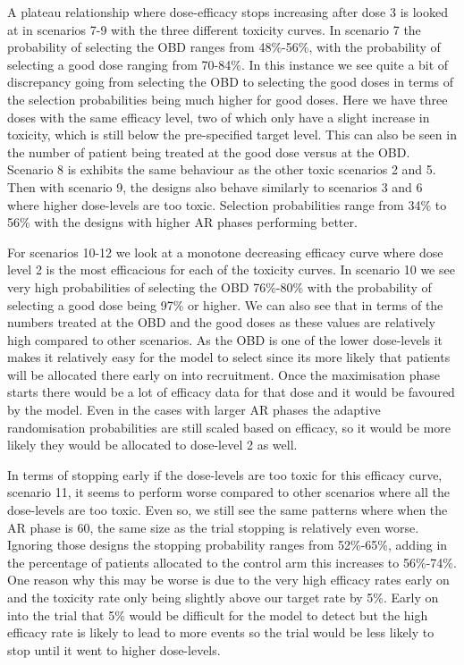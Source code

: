 A plateau relationship where dose-efficacy stops increasing after dose 3 is looked at in scenarios 7-9 with the three different toxicity curves. In scenario 7 the probability of selecting the OBD ranges from 48\%-56\%, with the probability of selecting a good dose ranging from 70-84\%. In this instance we see quite a bit of discrepancy going from selecting the OBD to selecting the good doses in terms of the selection probabilities being much higher for good doses. Here we have three doses with the same efficacy level, two of which only have a slight increase in toxicity, which is still below the pre-specified target level. This can also be seen in the number of patient being treated at the good dose versus at the OBD. Scenario 8 is exhibits the same behaviour as the other toxic scenarios 2 and 5. Then with scenario 9, the designs also behave similarly to scenarios 3 and 6 where higher dose-levels are too toxic. Selection probabilities range from 34\% to 56\% with the designs with higher AR phases performing better. 

For scenarios 10-12 we look at a monotone decreasing efficacy curve where dose level 2 is the most efficacious for each of the toxicity curves. In scenario 10 we see very high probabilities of selecting the OBD 76\%-80\% with the probability of selecting a good dose being 97\% or higher. We can also see that in terms of the numbers treated at the OBD and the good doses as these values are relatively high compared to other scenarios. As the OBD is one of the lower dose-levels it makes it relatively easy for the model to select since its more likely that patients will be allocated there early on into recruitment. Once the maximisation phase starts there would be a lot of efficacy data for that dose and it would be favoured by the model. Even in the cases with larger AR phases the adaptive randomisation probabilities are still scaled based on efficacy, so it would be more likely they would be allocated to dose-level 2 as well. 

In terms of stopping early if the dose-levels are too toxic for this efficacy curve, scenario 11, it seems to perform worse compared to other scenarios where all the dose-levels are too toxic. Even so, we still see the same patterns where when the AR phase is 60, the same size as the trial stopping is relatively even worse. Ignoring those designs the stopping probability ranges from 52\%-65\%, adding in the percentage of patients allocated to the control arm this increases to 56\%-74\%. One reason why this may be worse is due to the very high efficacy rates early on and the toxicity rate only being slightly above our target rate by 5\%. Early on into the trial that 5\% would be difficult for the model to detect but the high efficacy rate is likely to lead to more events so the trial would be less likely to stop until it went to higher dose-levels. 

